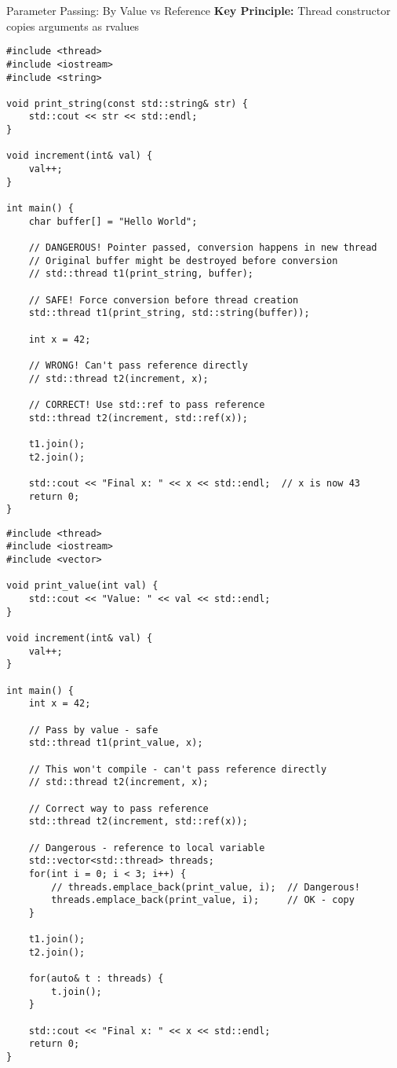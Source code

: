 \begin{frame}[fragile]{ Parameter Passing: By Value vs Reference}
	\textbf{Key Principle:} Thread constructor copies arguments as rvalues

	\begin{verbatim}
#include <thread>
#include <iostream>
#include <string>

void print_string(const std::string& str) {
    std::cout << str << std::endl;
}

void increment(int& val) {
    val++;
}

int main() {
    char buffer[] = "Hello World";

    // DANGEROUS! Pointer passed, conversion happens in new thread
    // Original buffer might be destroyed before conversion
    // std::thread t1(print_string, buffer);

    // SAFE! Force conversion before thread creation
    std::thread t1(print_string, std::string(buffer));

    int x = 42;

    // WRONG! Can't pass reference directly
    // std::thread t2(increment, x);

    // CORRECT! Use std::ref to pass reference
    std::thread t2(increment, std::ref(x));

    t1.join();
    t2.join();

    std::cout << "Final x: " << x << std::endl;  // x is now 43
    return 0;
}
	\end{verbatim}
	\begin{verbatim}
#include <thread>
#include <iostream>
#include <vector>

void print_value(int val) {
    std::cout << "Value: " << val << std::endl;
}

void increment(int& val) {
    val++;
}

int main() {
    int x = 42;

    // Pass by value - safe
    std::thread t1(print_value, x);

    // This won't compile - can't pass reference directly
    // std::thread t2(increment, x);

    // Correct way to pass reference
    std::thread t2(increment, std::ref(x));

    // Dangerous - reference to local variable
    std::vector<std::thread> threads;
    for(int i = 0; i < 3; i++) {
        // threads.emplace_back(print_value, i);  // Dangerous!
        threads.emplace_back(print_value, i);     // OK - copy
    }

    t1.join();
    t2.join();

    for(auto& t : threads) {
        t.join();
    }

    std::cout << "Final x: " << x << std::endl;
    return 0;
}
	\end{verbatim}
\end{frame}

